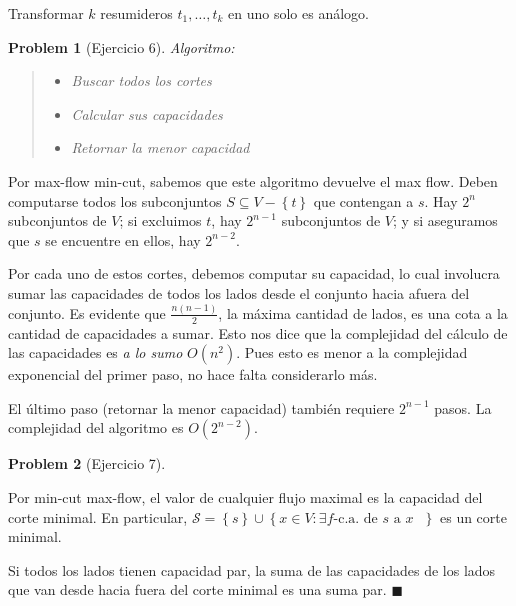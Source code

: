 \documentclass[a4paper]{article}
\newtheorem{problem}{Problem}
\newtheorem{problem}{Problem}
\begin{document}
Transformar $k$ resumideros $t_1, \ldots, t_k$ en uno solo es análogo.

\begin{problem}[Ejercicio 6]
   Algoritmo: 

   
   \small
   \begin{quote}
   
   \begin{itemize}
       \item Buscar todos los cortes 
        \item Calcular sus capacidades 
        \item Retornar la menor capacidad
   \end{itemize}
   
   \end{quote}
   \normalsize
   

\end{problem}

Por max-flow min-cut, sabemos que este algoritmo devuelve el max flow. Deben
computarse todos los subconjuntos $S \subseteq V - \left\{ t \right\} $ que
contengan a $s$. Hay $2^{n}$ subconjuntos de $V$; si excluimos $t$, hay $2^{n -
1}$ subconjuntos de $V$; y si aseguramos que $s$ se encuentre en ellos, hay
$2^{n - 2}$.

Por cada uno de estos cortes, debemos computar su capacidad, lo cual involucra
sumar las capacidades de todos los lados desde el conjunto hacia afuera del
conjunto. Es evidente que $\frac{n(n-1)}{2}$, la máxima cantidad de lados, es
una cota a la cantidad de capacidades a sumar. Esto nos dice que la complejidad
del cálculo de las capacidades es \textit{a lo sumo} $O(n^2)$. Pues esto es
menor a la complejidad exponencial del primer paso, no hace falta considerarlo
más. 

El último paso (retornar la menor capacidad) también requiere $2^{n-1}$ pasos.
La complejidad del algoritmo es $O(2^{n-2})$.

\begin{problem}[Ejercicio 7]
    
\end{problem}

Por min-cut max-flow, el valor de cualquier flujo maximal es la capacidad del
corte minimal. En particular, $\mathcal{S} = \left\{ s \right\} \cup  \left\{ x
\in V : \exists f\text{-c.a.} \text{ de $s$ a $x$ }\right\} $ es un corte
minimal.

Si todos los lados tienen capacidad par, la suma de las
capacidades de los lados que van desde hacia fuera del corte minimal es una suma
par. $\blacksquare$
\end{document}
